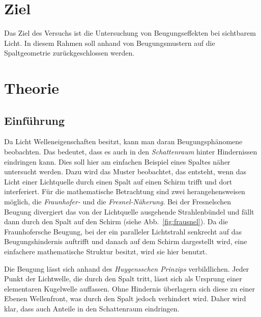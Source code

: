 \section{Ziel}
\label{sec:Ziel}
Das Ziel des Versuchs ist die Untersuchung von Beugungseffekten bei sichtbarem Licht. In diesem Rahmen soll anhand von Beugungsmustern auf die Spaltgeometrie zurückgeschlossen werden.

\section{Theorie}
\label{sec:theorie}

\subsection{Einführung}
Da Licht Welleneigenschaften besitzt, kann man daran Beugungsphänomene beobachten. Das bedeutet, dass es auch in den \emph{Schattenraum} hinter Hindernissen eindringen kann. Dies soll hier am einfachen Beispiel eines Spaltes näher untersucht werden. Dazu wird das Muster beobachtet, das entsteht, wenn das Licht einer Lichtquelle durch einen Spalt auf einen Schirm trifft und dort interferiert. Für die mathematische Betrachtung sind zwei herangehensweisen möglich, die \emph{Fraunhofer-} und die \emph{Fresnel-Näherung}. Bei der Fresnelschen Beugung divergiert das von der Lichtquelle ausgehende Strahlenbündel und fällt dann durch den Spalt auf den Schirm (siehe Abb.~\ref{fig:frausnel}). Da die Fraunhofersche Beugung, bei der ein paralleler Lichtstrahl senkrecht auf das Beugungshindernis auftrifft und danach auf dem Schirm dargestellt wird, eine einfachere mathematische Struktur besitzt, wird sie hier benutzt.


Die Beugung lässt sich anhand des \emph{Huygensschen Prinzips} verbildlichen. Jeder Punkt der Lichtwelle, die durch den Spalt tritt, lässt sich als Ursprung einer elementaren Kugelwelle auffassen. Ohne Hindernis überlagern sich diese zu einer Ebenen Wellenfront, was durch den Spalt jedoch verhindert wird. Daher wird klar, dass auch Anteile in den Schattenraum eindringen.

